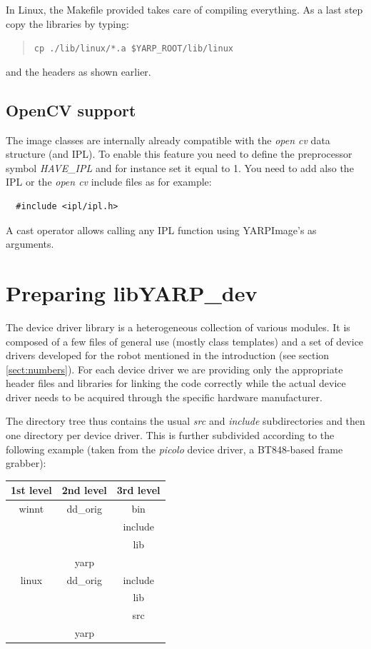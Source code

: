 In Linux, the Makefile provided takes care of compiling everything. As a last step copy the libraries by typing:
\begin{quote}
{\tt cp ./lib/linux/*.a \$YARP\_ROOT/lib/linux}
\end{quote}

\noindent and the headers as shown earlier. 


\subsection{OpenCV support}
The image classes are internally already compatible with the {\em open cv} data structure (and IPL). To enable this feature you need to define the preprocessor symbol {\em HAVE\_IPL} and for instance set it equal to 1. You need to add also the IPL or the {\em open cv} include files as for example:

\begin{verbatim}
  #include <ipl/ipl.h>
\end{verbatim}

A cast operator allows calling any IPL function using YARPImage's as arguments.
 
  
\section{Preparing libYARP\_dev}
The device driver library is a heterogeneous collection of various modules. It is composed of a few files of general use (mostly class templates) and a set of device drivers developed for the robot mentioned in the introduction (see section \ref{sect:numbers}). For each device driver we are providing only the appropriate header files and libraries for linking the code correctly while the actual device driver needs to be acquired through the specific hardware manufacturer.

The directory tree thus contains the usual {\em src} and {\em include} subdirectories and then one directory per device driver. This is further subdivided according to the following example (taken from the {\em picolo} device driver, a BT848-based frame grabber):

\begin{table}[h]
	\centering
		\begin{tabular}{|c|c|c|}
		\hline
			1st level & 2nd level & 3rd level \\
			\hline \hline
			winnt & dd\_orig & bin \\
			 &  & include \\
			 &  & lib \\
			 & yarp & \\
			\hline
			linux & dd\_orig & include \\
			 &  & lib \\
			 &  & src \\
			 & yarp & \\
			\hline
		\end{tabular}
\end{table}

